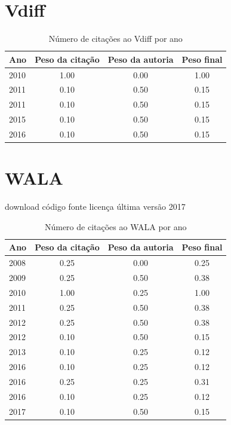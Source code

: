 \section{Vdiff}
\begin{table}[H]
\caption{Número de citações ao Vdiff por ano}
\centering
\begin{tabular}{| l | c | c | c |}
  \hline
  Ano & Peso da citação & Peso da autoria & Peso final \\
  \hline
  2010
    & 1.00
    & 0.00
    & {\color{blue} 1.00} \\
\hline
  2011
    & 0.10
    & 0.50
    & {\color{red} 0.15} \\
  2011
    & 0.10
    & 0.50
    & {\color{red} 0.15} \\
\hline
  2015
    & 0.10
    & 0.50
    & {\color{red} 0.15} \\
\hline
  2016
    & 0.10
    & 0.50
    & {\color{red} 0.15} \\
\hline
\end{tabular}
\end{table}
\section{WALA}
\checkmark download
\checkmark código fonte
\checkmark licença
\checkmark última versão 2017
\begin{table}[H]
\caption{Número de citações ao WALA por ano}
\centering
\begin{tabular}{| l | c | c | c |}
  \hline
  Ano & Peso da citação & Peso da autoria & Peso final \\
  \hline
  2008
    & 0.25
    & 0.00
    & {\color{red} 0.25} \\
\hline
  2009
    & 0.25
    & 0.50
    & {\color{red} 0.38} \\
\hline
  2010
    & 1.00
    & 0.25
    & {\color{blue} 1.00} \\
\hline
  2011
    & 0.25
    & 0.50
    & {\color{red} 0.38} \\
\hline
  2012
    & 0.25
    & 0.50
    & {\color{red} 0.38} \\
  2012
    & 0.10
    & 0.50
    & {\color{red} 0.15} \\
\hline
  2013
    & 0.10
    & 0.25
    & {\color{red} 0.12} \\
\hline
  2016
    & 0.10
    & 0.25
    & {\color{red} 0.12} \\
  2016
    & 0.25
    & 0.25
    & {\color{red} 0.31} \\
  2016
    & 0.10
    & 0.25
    & {\color{red} 0.12} \\
\hline
  2017
    & 0.10
    & 0.50
    & {\color{red} 0.15} \\
\hline
\end{tabular}
\end{table}
